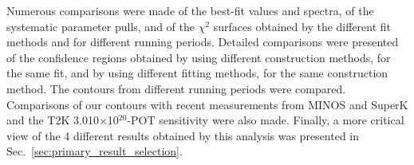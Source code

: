 Numerous comparisons were made of the best-fit values and spectra, of the systematic parameter pulls,
and of the $\chi^{2}$ surfaces obtained by the different fit methods and for different running periods.
Detailed comparisons were presented of the confidence regions obtained
by using different construction methods, for the same fit, and
by using different fitting methods, for the same construction method.
The contours from different running periods were compared.
Comparisons of our contours with
recent measurements from MINOS and SuperK and the T2K 3.010$\times$10$^{20}$-POT sensitivity
were also made. Finally, a more critical view of the 4 different results obtained by
this analysis was presented in Sec.\ \ref{sec:primary_result_selection}.




%
%
